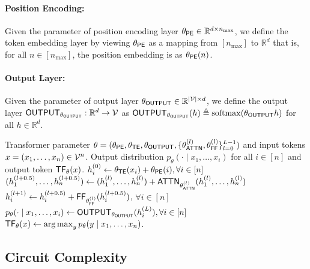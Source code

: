 \paragraph{Position Encoding:} Given the parameter of position encoding layer $\theta_{\mathsf{PE}} \in \mathbb{R}^{d \times n_{\max}}$, we define the token embedding layer by viewing $\theta_{\mathsf{PE}}$ as a mapping from $[n_{\max}] $ to $ \mathbb{R}^d$ that is, for all $n\in [n_{\max}]$, the position embedding is as $\theta_{\mathsf{PE}}(n)$. 

\paragraph{Output Layer:} Given the parameter of output layer $\theta_{\mathsf{OUTPUT}}  \in \mathbb{R}^{|{\mathcal{V}}| \times  d}$, we define the output layer $\mathsf{OUTPUT}_{\theta_{\mathsf{OUTPUT}}}:\mathbb{R}^d \to {\mathcal{V}}$ as $\mathsf{OUTPUT}_{\theta_{\mathsf{OUTPUT}}}(h)\triangleq \mathrm{softmax}(\theta_{\mathsf{OUTPUT}}h)$ for all $h\in \mathbb{R}^d$. 






\begin{algorithm}
\caption{Decoder-only Transformer, $\protect\transformer_\theta$ and $p_\theta$}\label{alg:defi_transformer}
\begin{algorithmic}[1]

\Require   Transformer parameter $\theta = (\theta_{\mathsf{PE}},\theta_{\mathsf{TE}},\theta_{\mathsf{OUTPUT}},\{\theta^{(l)}_{\mathsf{ATTN}},\theta^{(l)}_{\mathsf{FF}}\}_{l=0}^{L-1} )$ and input tokens $x= (x_1,\ldots, x_n)\in{\mathcal{V}}^n$.
\Ensure Output distribution $p_\theta(\cdot \mid x_1,\ldots, x_i)$ for all $i\in[n]$ and output token $\mathsf{TF}_\theta(x)$.
\State $h^{(0)}_i \gets \theta_{\mathsf{TE}}(x_i) + \theta_{\mathsf{PE}}(i), \forall i \in [n]$
\State	$( h^{(l+0.5)}_1,\ldots, h^{(l+0.5)}_n) \gets (h^{(l)}_1,\ldots, h^{(l)}_n) +\mathsf{ATTN}_{\theta^{(l)}_{\mathsf{ATTN}}}(h^{(l)}_1,\ldots, h^{(l)}_n) $
\State  $ h^{(l+1)}_i \gets  h^{(l+0.5)}_i + \mathsf{FF}_{\theta^{(l)}_{\mathsf{FF}}}(h^{(l+0.5)}_i)$, $\forall i \in [n]$
\EndFor
\State $p_\theta(\cdot\mid x_1,\ldots,x_i) \gets  \mathsf{OUTPUT}_{\theta_{\mathsf{OUTPUT}}}(h^{(L)}_i), \forall i \in [n]$
\State $\mathsf{TF}_\theta(x)\gets \operatorname*{arg\,max}_{y} p_\theta(y\mid x_1,\ldots,x_n)$.
\end{algorithmic}
\end{algorithm}

\subsection{Circuit Complexity}\label{subsec:circuit}
 
